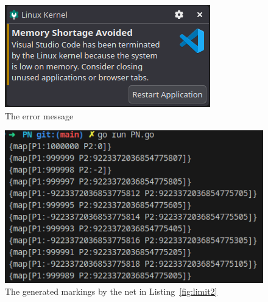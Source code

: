 \documentclass[12pt]{article}
\begin{document}
      \begin{figure}[htbp]
        \centering
        \includegraphics[width=\linewidth/2]{Error_message.png}  %
        \caption{The error message}
        \label{fig:error}
      \end{figure}
      
      \begin{figure}[p]  %
        \centering
        
      \end{figure}

      \begin{figure}[htbp]
        \centering
        \includegraphics[width=\linewidth/3 *2]{Marking.png}  %
        \caption{The generated markings by the net in Listing~\ref{fig:limit2}}
        \label{fig:markings}
      \end{figure}
\end{document}
